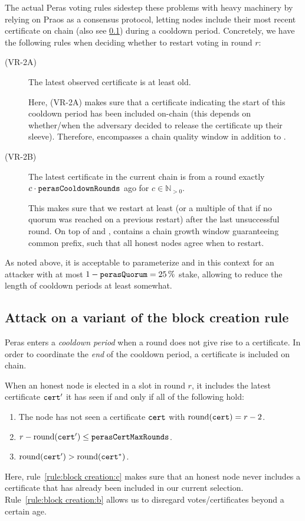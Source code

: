 The actual Peras voting rules sidestep these problems with heavy machinery by relying on Praos as a consensus protocol, letting nodes include their most recent certificate on chain (also see \cref{sec:attack block creation rule}) during a cooldown period.
Concretely, we have the following rules when deciding whether to restart voting in round $r$:
\begin{description}
\item[(VR-2A)] The latest observed certificate is at least \perasIgnoranceRounds{} old.

  Here, (VR-2A) makes sure that a certificate indicating the start of this cooldown period has been included on-chain (this depends on whether/when the adversary decided to release the certificate up their sleeve).
  Therefore, \perasIgnoranceRounds{} encompasses a chain quality window \Tcq{} in addition to \Theal{}.
\item[(VR-2B)] The latest certificate in the current chain is from a round exactly $c\cdot \mathtt{perasCooldownRounds}$ ago for $c \in\mathbb{N}_{>0}$.

  This makes sure that we restart at least \perasCooldownRounds{} (or a multiple of that if no quorum was reached on a previous restart) after the last unsuccessful round.
  On top of \Theal{} and \Tcq{}, \perasCooldownRounds{} contains a chain growth window \Tcp{} guaranteeing common prefix, such that all honest nodes agree when to restart.
\end{description}

As noted above, it is acceptable to parameterize \Tcq{} and \Tcp{} in this context for an attacker with at most $1-\mathtt{perasQuorum}{} = \qty{25}{\percent}$ stake, allowing to reduce the length of cooldown periods at least somewhat.

\subsection{Attack on a variant of the block creation rule}\label{sec:attack block creation rule}

Peras enters a \emph{cooldown period} when a round does not give rise to a certificate.
In order to coordinate the \emph{end} of the cooldown period, a certificate is included on chain.

When an honest node is elected in a slot in round $r$, it includes the latest certificate $\mathtt{cert}'$ it has seen if and only if all of the following hold:
\begin{enumerate}
\item\label{rule:block creation:a} The node has not seen a certificate $\mathtt{cert}$ with $\operatorname{round}(\mathtt{cert})=r-2$.
\item\label{rule:block creation:b} $r-\operatorname{round}(\mathtt{cert}') \le \mathtt{perasCertMaxRounds}$.
\item\label{rule:block creation:c} $\operatorname{round}(\mathtt{cert}') > \operatorname{round}(\mathtt{cert}^*)$.
\end{enumerate}
Here, rule~\ref{rule:block creation:c} makes sure that an honest node never includes a certificate that has already been included in our current selection.
Rule~\ref{rule:block creation:b} allows us to disregard votes/certificates beyond a certain age.

